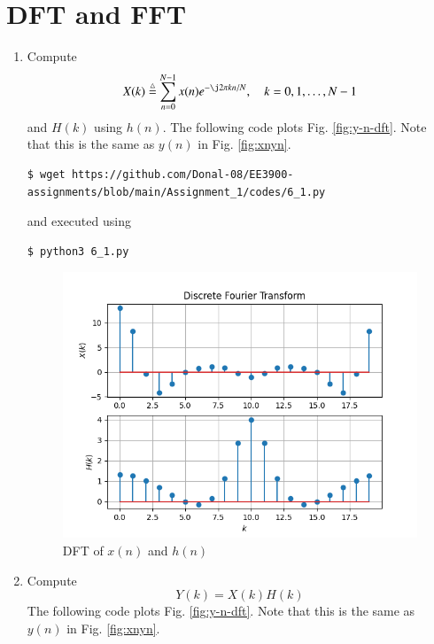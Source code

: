 \documentclass[journal,12pt,twocolumn]{IEEEtran}
\newcommand{\define}{\stackrel{\triangle}{=}}
\renewcommand\thesection{\arabic{section}}
\begin{document}
\section{DFT and FFT}
\begin{enumerate}[label=\thesection.\arabic*]
\item
Compute
\begin{equation}
X(k) \define \sum _{n=0}^{N-1}x(n) e^{-\j2\pi kn/N}, \quad k = 0,1,\dots, N-1
\end{equation}
and $H(k)$ using $h(n)$.
\solution The following code plots Fig. \eqref{fig:y-n-dft}. Note that this is the same as $y(n)$ in Fig. \eqref{fig:xnyn}.

\begin{lstlisting}
$ wget https://github.com/Donal-08/EE3900-assignments/blob/main/Assignment_1/codes/6_1.py
\end{lstlisting}
and executed using
\begin{lstlisting}
$ python3 6_1.py
\end{lstlisting}

\begin{figure}[ht!]
	\centering
	\includegraphics[width=\columnwidth]{figs/6.1.png}
	\caption{DFT of $x(n)$ and $h(n)$}
	\label{fig:y-n-dft}
\end{figure}
\item Compute 
\begin{equation}
Y(k) = X(k)H(k)
\label{eq:fp}
\end{equation}
\solution The following code plots Fig. \eqref{fig:y-n-dft}. Note that this is the same as $y(n)$ in Fig. \eqref{fig:xnyn}.


\end{enumerate}
\end{document}
